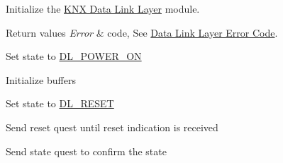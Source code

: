 Initialize the \hyperlink{group___k_n_x___d_l}{K\+NX Data Link Layer} module. 


\begin{DoxyRetVals}{Return values}
{\em Error} & code, See \hyperlink{group___d_l___error___code}{Data Link Layer Error Code}. \\
\hline
\end{DoxyRetVals}
Set state to \hyperlink{group___k_n_x___d_l___exported___types_gga143539be3680d9b7f990a9dfe1df40fea8be7f520654ac8f7854b3caf3b0a5019}{D\+L\+\_\+\+P\+O\+W\+E\+R\+\_\+\+ON}

Initialize buffers

Set state to \hyperlink{group___k_n_x___d_l___exported___types_gga143539be3680d9b7f990a9dfe1df40fea80e6219a436df0a34c8533186c5e44c2}{D\+L\+\_\+\+R\+E\+S\+ET}

Send reset quest until reset indication is received

Send state quest to confirm the state 